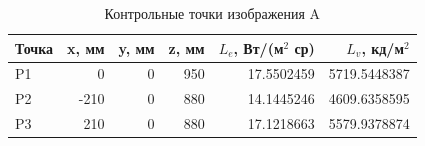 \begin{table}[H]\centering\footnotesize
\caption{Контрольные точки изображения A}
\begin{tabular}{@{}lrrr rr@{}}\toprule Точка & x, мм & y, мм & z, мм & $L_e$, Вт/(м$^2$ ср) & $L_v$, кд/м$^2$\\\midrule
P1 & 0 & 0 & 950 & 17.5502459 & 5719.5448387 \\
P2 & -210 & 0 & 880 & 14.1445246 & 4609.6358595 \\
P3 & 210 & 0 & 880 & 17.1218663 & 5579.9378874 \\
\bottomrule\end{tabular}\end{table}